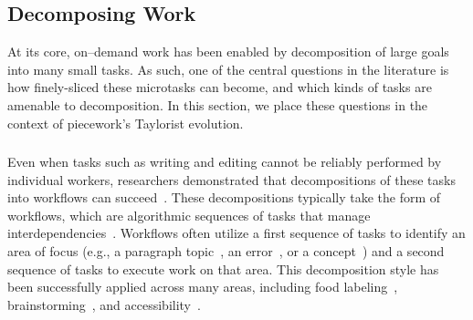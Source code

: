 \documentclass[trackingWork]{subfiles}
\begin{document}
\subsection[How far can work be decomposed into smaller microtasks]{Decomposing Work}\label{sec:decomposition}

At its core,
on--demand work has been enabled by decomposition of large goals into many small tasks.
As such,
one of the central questions in the literature is how finely-sliced these microtasks can become, and which kinds of tasks are amenable to decomposition.
In this section,
we place these questions in the context of piecework's Taylorist evolution.

\begin{comment}
Outline:
Crowd work
	- How do we take work and split it up into smaller work?
	- How small can we go?
	- Once we split up, what happens? Marketplace choosing
Piecework
	- How do we take work and split it up?
	[ - how small can we go? ]
	[- Nothing about how people choose. ]
Same/different
	[- task data science ]
	[- Cognitive barriers, task switching, etc, dominates]
	[ - Switching is different, marketplace model ]
\end{comment}

\subsubsection{\crowdworkpers}
Even when tasks such as writing and editing cannot be reliably performed by individual workers,
researchers demonstrated that
decompositions of these tasks into workflows can succeed~\cite{crowdForgeKittur,
bernsteinSoylent,
writingMicroTasks,
Nebeling:2016:WCW:2858036.2858169}. 
These decompositions typically take the form of workflows,
which are algorithmic sequences of tasks that manage interdependencies~\cite{Bigham2014}. 
Workflows often utilize a first sequence of tasks to identify an area of focus (e.g.,
a paragraph topic~\cite{crowdForgeKittur},
an error~\cite{bernsteinSoylent},
or a concept~\cite{Yu2016a,Yu2016b}) and a second sequence of tasks to execute work on that area. 
This decomposition style has been successfully applied across many areas,
including food labeling~\cite{noronha2011platemate},
brainstorming~\cite{siangliulue2015toward,yu2014distributed},
and accessibility~\cite{lasecki2013chorus,lasecki2012real,Lasecki2011}.
\end{document}
